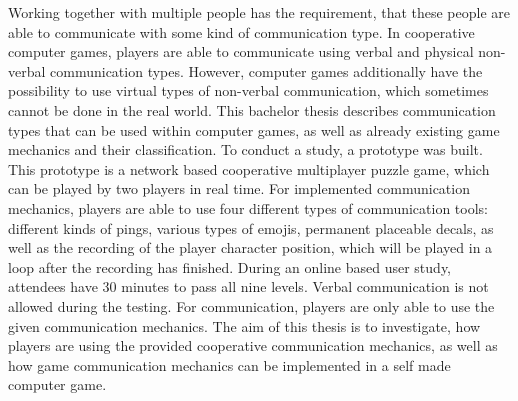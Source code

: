 Working together with multiple people has the requirement, that these people are able to communicate with some kind of communication type.
In cooperative computer games, players are able to communicate using verbal and physical non-verbal communication types. However, computer games additionally have the possibility to use virtual types of non-verbal communication, which sometimes cannot be done in the real world.
This bachelor thesis describes communication types that can be used within computer games, as well as already existing game mechanics and their classification.
To conduct a study, a prototype was built. This prototype is a network based cooperative multiplayer puzzle game, which can be played by two players in real time. For implemented communication mechanics, players are able to use four different types of communication tools: different kinds of pings, various types of emojis, permanent placeable decals, as well as the recording of the player character position, which will be played in a loop after the recording has finished.
During an online based user study, attendees have 30 minutes to pass all nine levels. 
Verbal communication is not allowed during the testing. For communication, players are only able to use the given communication mechanics.
The aim of this thesis is to investigate, how players are using the provided cooperative communication mechanics, as well as how game communication mechanics can be implemented in a self made computer game. 
